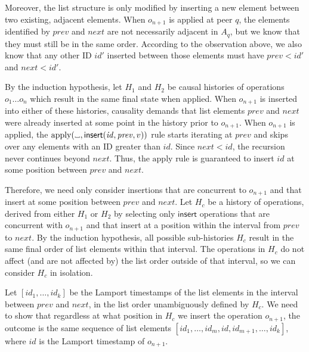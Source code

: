 \documentclass[10pt,journal,compsoc]{IEEEtran}
\newcommand{\placeholder}{%
  \makebox[0.7em]{%
    \kern.07em
    \vrule height.3ex
    \hrulefill
    \vrule height.3ex
    \kern.07em
  }%
}
\begin{document}
Moreover, the list structure is only modified by inserting a new element between two existing, adjacent elements. When $o_{n+1}$ is applied at peer $q$, the elements identified by $\mathit{prev}$ and $\mathit{next}$ are not necessarily adjacent in $A_q$, but we know that they must still be in the same order. According to the observation above, we also know that any other ID $\mathit{id}'$ inserted between those elements must have $\mathit{prev} < \mathit{id}'$ and $\mathit{next} < \mathit{id}'$.

By the induction hypothesis, let $H_1$ and $H_2$ be causal histories of operations $o_1 \dots o_n$ which result in the same final state when applied. When $o_{n+1}$ is inserted into either of these histories, causality demands that list elements $\mathit{prev}$ and $\mathit{next}$ were already inserted at some point in the history prior to $o_{n+1}$. When $o_{n+1}$ is applied, the $\mathrm{apply}(\placeholder, \mathsf{insert}(\mathit{id}, \mathit{prev}, v))$ rule starts iterating at $\mathit{prev}$ and skips over any elements with an ID greater than $\mathit{id}$. Since $\mathit{next} < \mathit{id}$, the recursion never continues beyond $\mathit{next}$. Thus, the $\mathrm{apply}$ rule is guaranteed to insert $\mathit{id}$ at some position between $\mathit{prev}$ and $\mathit{next}$.

Therefore, we need only consider insertions that are concurrent to $o_{n+1}$ and that insert at some position between $\mathit{prev}$ and $\mathit{next}$. Let $H_c$ be a history of operations, derived from either $H_1$ or $H_2$ by selecting only $\mathsf{insert}$ operations that are concurrent with $o_{n+1}$ and that insert at a position within the interval from $\mathit{prev}$ to $\mathit{next}$. By the induction hypothesis, all possible sub-histories $H_c$ result in the same final order of list elements within that interval. The operations in $H_c$ do not affect (and are not affected by) the list order outside of that interval, so we can consider $H_c$ in isolation.

Let $[\mathit{id}_1, \dots, \mathit{id}_k]$ be the Lamport timestamps of the list elements in the interval between $\mathit{prev}$ and $\mathit{next}$, in the list order unambiguously defined by $H_c$. We need to show that regardless at what position in $H_c$ we insert the operation $o_{n+1}$, the outcome is the same sequence of list elements $[\mathit{id}_1, \dots, \mathit{id}_m, \mathit{id}, \mathit{id}_{m+1}, \dots, \mathit{id}_k]$, where $\mathit{id}$ is the Lamport timestamp of $o_{n+1}$.
\end{document}
